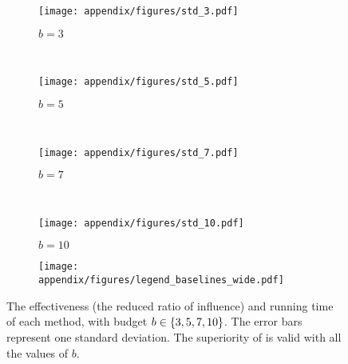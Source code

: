 \begin{figure*}[t!]
    \centering
    \begin{subfigure}{0.65\linewidth}
        \texttt{[image: appendix/figures/std\_3.pdf]}
        \caption{$b=3$}
    \end{subfigure} \\

    \begin{subfigure}{0.65\linewidth}
        \texttt{[image: appendix/figures/std\_5.pdf]}
        \caption{$b=5$}
    \end{subfigure} \\
    
    \begin{subfigure}{0.65\linewidth}
        \texttt{[image: appendix/figures/std\_7.pdf]}
        \caption{$b=7$}
    \end{subfigure} \\
    
    \begin{subfigure}{0.65\linewidth}
        \texttt{[image: appendix/figures/std\_10.pdf]}
        \caption{$b=10$}
    \end{subfigure}

    \begin{subfigure}{0.8\linewidth}
        \texttt{[image: appendix/figures/legend\_baselines\_wide.pdf]}
    \end{subfigure}
    
    \caption{The effectiveness (the reduced ratio of influence) and running time of each method, with budget $b \in \{3, 5, 7, 10\}$.
    The error bars represent one standard deviation.
    The superiority of \method is valid with all the values of $b$.}
    \label{fig:app_perf}
\end{figure*}